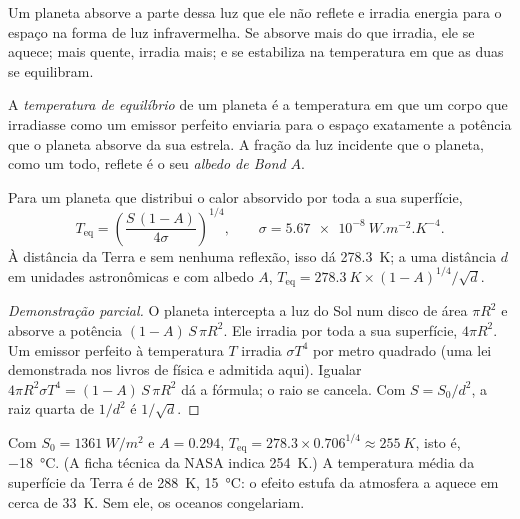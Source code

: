 Um planeta absorve a parte dessa luz que ele não reflete e irradia energia
para o espaço na forma de luz infravermelha. Se absorve mais do que irradia,
ele se aquece; mais quente, irradia mais; e se estabiliza na temperatura em
que as duas se equilibram.

\begin{definition}\label{def:g10:habitable-planet:equilibrium-temperature}
A \emph{temperatura de equilíbrio}
de um planeta é a temperatura em que um corpo que irradiasse como um
emissor perfeito enviaria para o espaço exatamente a potência que o planeta
absorve da sua estrela. A fração da luz incidente que o planeta, como um
todo, reflete é o seu \emph{albedo de Bond} $A$.
\end{definition}

\begin{proposition}\label{prop:g10:habitable-planet:teq}
Para um planeta que distribui o calor absorvido por toda a sua superfície,
\[
  T_{\mathrm{eq}} = \left(\frac{S\,(1-A)}{4\sigma}\right)^{1/4},
  \qquad \sigma = \qty{5.67e-8}{W.m^{-2}.K^{-4}}.
\]
À distância da Terra e sem nenhuma reflexão, isso dá \qty{278.3}{K}; a uma
distância $d$ em unidades astronômicas e com albedo $A$,
$T_{\mathrm{eq}} = \qty{278.3}{K} \times (1-A)^{1/4}/\sqrt{d}$.
\end{proposition}

\begin{proof}[Demonstração parcial]
O planeta intercepta a luz do Sol num disco de área $\pi R^2$ e absorve a
potência $(1-A)\,S\,\pi R^2$. Ele irradia por toda a sua superfície,
$4\pi R^2$. Um emissor perfeito à temperatura $T$ irradia $\sigma T^4$ por
metro quadrado (uma lei demonstrada nos livros de física e admitida aqui).
Igualar $4\pi R^2 \sigma T^4 = (1-A)\,S\,\pi R^2$ dá a fórmula; o raio se
cancela. Com $S = S_0/d^2$, a raiz quarta de $1/d^2$ é $1/\sqrt d$.
\end{proof}

\begin{example}[A Terra]\label{ex:g10:habitable-planet:earth}
Com $S_0 = \qty{1361}{W/m^2}$ e $A = 0.294$,
$T_{\mathrm{eq}} = 278.3 \times 0.706^{1/4} \approx \qty{255}{K}$, isto é,
\qty{-18}{\degreeCelsius}. (A ficha técnica da NASA indica \qty{254}{K}.) A
temperatura média da superfície da Terra é de \qty{288}{K},
\qty{15}{\degreeCelsius}: o efeito estufa da atmosfera a aquece em cerca de
\qty{33}{K}. Sem ele, os oceanos congelariam.
\end{example}

